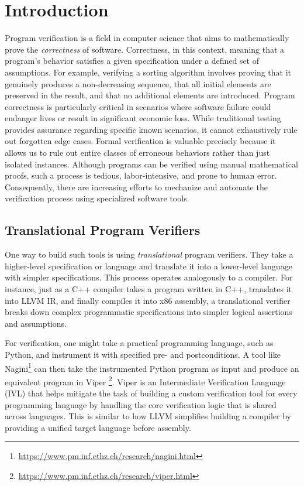 \chapter{Introduction}

Program verification is a field in computer science that aims to mathematically prove the \emph{correctness} of software.
Correctness, in this context, meaning that a program's behavior satisfies a given specification under a defined set of assumptions.
For example, verifying a sorting algorithm involves proving that it genuinely produces a non-decreasing sequence, that all initial elements are preserved in the result, and that no additional elements are introduced.
Program correctness is particularly critical in scenarios where software failure could endanger lives or result in significant economic loss.
While traditional testing provides assurance regarding specific known scenarios, it cannot exhaustively rule out forgotten edge cases.
Formal verification is valuable precisely because it allows us to rule out entire classes of erroneous behaviors rather than just isolated instances.
Although programs can be verified using manual mathematical proofs, such a process is tedious, labor-intensive, and prone to human error.
Consequently, there are increasing efforts to mechanize and automate the verification process using specialized software tools.


\section{Translational Program Verifiers}

One way to build such tools is using \emph{translational} program verifiers.
They take a higher-level specification or language
and translate it into a lower-level language with simpler specifications.
This process operates analogously to a compiler. %
For instance, just as a C++ compiler takes a program written in C++, translates it into LLVM IR, and finally compiles it into x86 assembly,
a translational verifier breaks down complex programmatic specifications into simpler logical assertions and assumptions.

For verification, one might take a practical programming language, such as Python,
and instrument it with specified pre- and postconditions.
A tool like Nagini\footnote{\url{https://www.pm.inf.ethz.ch/research/nagini.html}}
can then take the instrumented Python program as input and produce an equivalent program in Viper
\footnote{\url{https://www.pm.inf.ethz.ch/research/viper.html}}.
Viper is an Intermediate Verification Language (IVL) that helps mitigate the task of building a custom verification tool
for every programming language by handling the core verification logic that is shared across languages.
This is similar to how LLVM simplifies building a compiler by providing a unified target language before assembly. 

